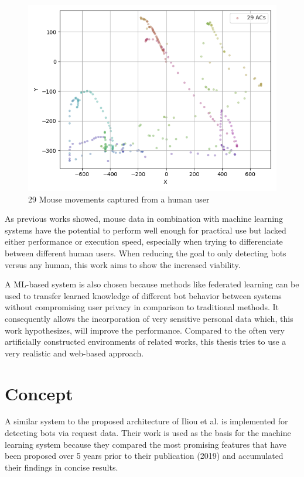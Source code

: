 \documentclass[
    fontsize=12pt,
    headings=small,
    parskip=half,           %
    bibliography=totoc,
    numbers=noenddot,       %
    open=any,               %
    final                   %
]{scrreprt}
\begin{document}
\begin{figure}[h]
	\includegraphics[width=\textwidth]{figures/user_mouse_heatmap.png}
	\caption{29 Mouse movements captured from a human user}
	\label{fig:user_mouse_heatmap}
\end{figure}

As previous works showed, mouse data in combination with machine learning systems have the potential to perform well enough for practical use but lacked either performance or execution speed, especially when trying to differenciate between different human users. When reducing the goal to only detecting bots versus any human, this work aims to show the increased viability.

A ML-based system is also chosen because methods like federated learning \cite{DBLP:journals/corr/KonecnyMR15} \cite{DBLP:journals/corr/KonecnyMRR16} can be used to transfer learned knowledge of different bot behavior between systems without compromising user privacy in comparison to traditional methods. It consequently allows the incorporation of very sensitive personal data which, this work hypothesizes, will improve the performance. Compared to the often very artificially constructed environments of related works, this thesis tries to use a very realistic and web-based approach.


\section{Concept}

A similar system to the proposed architecture of Iliou et al. \cite{10.1145/3339252.3339267} is implemented for detecting bots via request data. Their work is used as the basis for the machine learning system because they compared the most promising features that have been proposed over 5 years prior to their publication (2019) and accumulated their findings in concise results.
\end{document}
